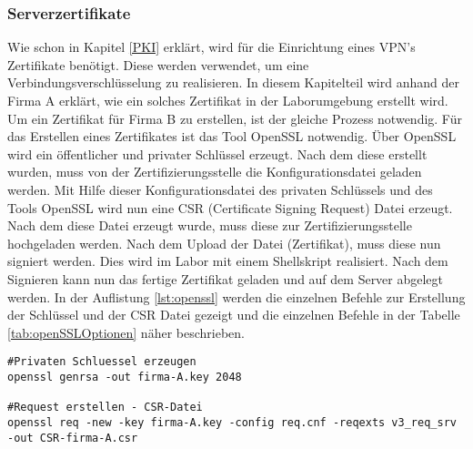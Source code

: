 \subsubsection{Serverzertifikate}
Wie schon in Kapitel \ref{PKI} erklärt, wird für die  Einrichtung eines VPN's Zertifikate benötigt. Diese werden verwendet, um eine Verbindungsverschlüsselung zu realisieren. In diesem Kapitelteil wird anhand der Firma A erklärt, wie ein solches Zertifikat in der Laborumgebung erstellt wird. Um ein Zertifikat für Firma B zu erstellen, ist der gleiche Prozess notwendig. \newline
Für das Erstellen eines Zertifikates ist das Tool OpenSSL notwendig. Über OpenSSL wird ein öffentlicher und privater Schlüssel erzeugt. Nach dem diese erstellt wurden, muss von der Zertifizierungsstelle die Konfigurationsdatei geladen werden. Mit Hilfe dieser Konfigurationsdatei des privaten Schlüssels und des Tools OpenSSL wird nun eine CSR (Certificate Signing Request) Datei erzeugt. Nach dem diese Datei erzeugt wurde, muss diese zur Zertifizierungsstelle hochgeladen werden. Nach dem Upload der Datei (Zertifikat), muss diese nun signiert werden. Dies wird im Labor mit einem Shellskript realisiert. Nach dem Signieren kann nun das fertige Zertifikat geladen und auf dem Server 
abgelegt werden. In der Auflistung \ref{lst:openssl}  werden die einzelnen Befehle zur Erstellung der Schlüssel und der CSR Datei gezeigt und die einzelnen Befehle in der Tabelle \ref{tab:openSSLOptionen} näher beschrieben.\newline
\lstset{
	basicstyle=\footnotesize, frame=tb,
	xleftmargin=.2\textwidth, xrightmargin=.2\textwidth
}
\begin{lstlisting}[caption={Erzeugen eines privaten Schlüssels mit OpenSSL},label=lst:openssl]
#Privaten Schluessel erzeugen
openssl genrsa -out firma-A.key 2048

#Request erstellen - CSR-Datei
openssl req -new -key firma-A.key -config req.cnf -reqexts v3_req_srv -out CSR-firma-A.csr
\end{lstlisting}
\vspace{\baselineskip}
